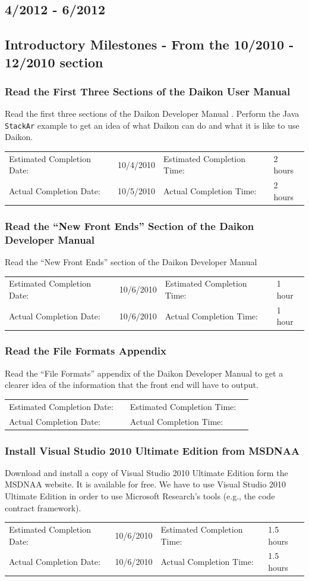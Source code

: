 \documentclass{article}
\newcommand{\timetbl}[4]{\par\vspace{5mm}\begin{tabular}{ l l l l }
Estimated Completion Date: & #1 & Estimated Completion Time: & #2 \\
Actual Completion Date: & #3 & Actual Completion Time: & #4 \\
\end{tabular}}
\begin{document}
\subsection{4/2012 - 6/2012}

\subsection{Introductory Milestones - From the 10/2010 - 12/2010 section}

\subsubsection{Read the First Three Sections of the Daikon User Manual}
Read the first three sections of the Daikon Developer Manual \cite{DaikonUserManual:Online}. Perform the Java \verb|StackAr| example to get an idea of what Daikon can do and what it is like to use Daikon.

\timetbl{10/4/2010}{2 hours}{10/5/2010}{2 hours}

\subsubsection{Read the ``New Front Ends'' Section of the Daikon Developer Manual}
Read the ``New Front Ends'' section of the Daikon Developer Manual \cite{DaikonDeveloperManual:Online}

\timetbl{10/6/2010}{1 hour}{10/6/2010}{1 hour}

\subsubsection{Read the File Formats Appendix}
Read the ``File Formats'' appendix of the Daikon Developer Manual to get a clearer idea of the information that the front end will have to output.

\timetbl{}{}{}{}

\subsubsection{Install Visual Studio 2010 Ultimate Edition from MSDNAA}
Download and install a copy of Visual Studio 2010 Ultimate Edition form the MSDNAA website. It is available for free. We have to use Visual Studio 2010 Ultimate Edition in order to use Microsoft Research's tools (e.g., the code contract framework).

\timetbl{10/6/2010}{1.5 hours}{10/6/2010}{1.5 hours}
\end{document}
